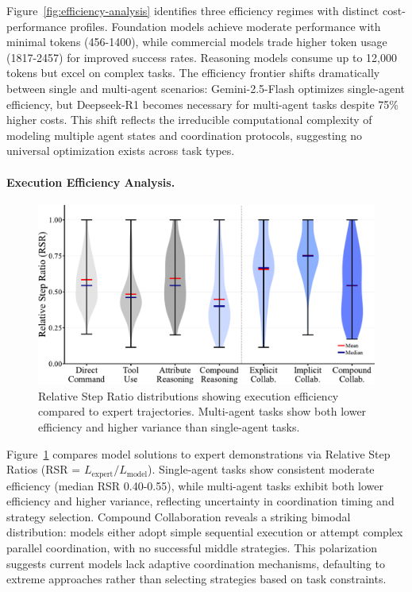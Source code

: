 Figure~\ref{fig:efficiency-analysis} identifies three efficiency regimes with distinct cost-performance profiles. Foundation models achieve moderate performance with minimal tokens (456-1400), while commercial models trade higher token usage (1817-2457) for improved success rates. Reasoning models consume up to 12,000 tokens but excel on complex tasks. The efficiency frontier shifts dramatically between single and multi-agent scenarios: Gemini-2.5-Flash optimizes single-agent efficiency, but Deepseek-R1 becomes necessary for multi-agent tasks despite 75\% higher costs. This shift reflects the irreducible computational complexity of modeling multiple agent states and coordination protocols, suggesting no universal optimization exists across task types.

\paragraph{Execution Efficiency Analysis.}
\begin{figure}[htbp]
    \centering
    \includegraphics[width=0.75\columnwidth,clip]{figures/ae_2.pdf}
    \caption{Relative Step Ratio distributions showing execution efficiency compared to expert trajectories. Multi-agent tasks show both lower efficiency and higher variance than single-agent tasks.}
    \label{fig:expert-trajectory-efficiency}
\end{figure}
Figure~\ref{fig:expert-trajectory-efficiency} compares model solutions to expert demonstrations via Relative Step Ratios (RSR = $L_{\text{expert}}/L_{\text{model}}$). Single-agent tasks show consistent moderate efficiency (median RSR 0.40-0.55), while multi-agent tasks exhibit both lower efficiency and higher variance, reflecting uncertainty in coordination timing and strategy selection. Compound Collaboration reveals a striking bimodal distribution: models either adopt simple sequential execution or attempt complex parallel coordination, with no successful middle strategies. This polarization suggests current models lack adaptive coordination mechanisms, defaulting to extreme approaches rather than selecting strategies based on task constraints.